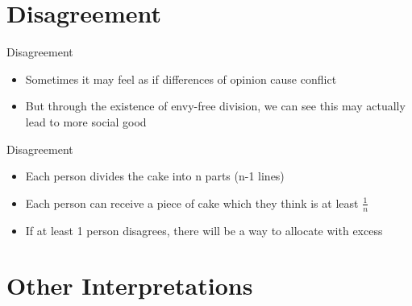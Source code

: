 \documentclass[aspectratio=169,xcolor=dvipsnames]{beamer}
\begin{document}
\section{Disagreement}
\begin{frame}{Disagreement}
	\begin{itemize}
		\item Sometimes it may feel as if differences of opinion cause conflict
		\item But through the existence of envy-free division, we can see this may actually lead to more social good
	\end{itemize}
\end{frame}
\begin{frame}{Disagreement}
	\begin{itemize}
		\item Each person divides the cake into n parts (n-1 lines)
		\item Each person can receive a piece of cake which they think is at least $\frac{1}{n}$ \pause
		\item If at least 1 person disagrees, there will be a way to allocate with excess
	\end{itemize}
\end{frame}
\section{Other Interpretations}
\end{document}
